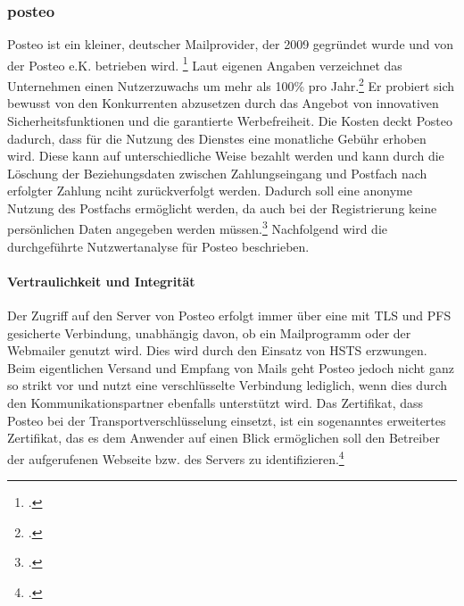 \documentclass  [paper=a4,
				fontsize=12pt,
				listof=totoc,
				bibliography=totoc
				]{scrreprt}
\begin{document}
				\subsubsection{posteo}
				\label{subsubsec:posteo}
					Posteo ist ein kleiner, deutscher Mailprovider, der 2009 gegründet wurde und von der Posteo e.K. betrieben wird. \footcite[Vgl.][]{Posteo2013b}
					Laut eigenen Angaben verzeichnet das Unternehmen einen Nutzerzuwachs um mehr als 100\% pro Jahr.\footcite[Vgl.][]{Posteo2013b}
					Er probiert sich bewusst von den Konkurrenten abzusetzen durch das Angebot von innovativen Sicherheitsfunktionen und die garantierte Werbefreiheit.
					Die Kosten deckt Posteo dadurch, dass für die Nutzung des Dienstes eine monatliche Gebühr erhoben wird.
					Diese kann auf unterschiedliche Weise bezahlt werden und kann durch die Löschung der Beziehungsdaten zwischen Zahlungseingang und Postfach nach erfolgter Zahlung nciht zurückverfolgt werden.
					Dadurch soll eine anonyme Nutzung des Postfachs ermöglicht werden, da auch bei der Registrierung keine persönlichen Daten angegeben werden müssen.\footcite[Vgl.][]{Posteo2013a}
					Nachfolgend wird die durchgeführte Nutzwertanalyse für Posteo beschrieben.
					\medskip\\
					
					\paragraph{Vertraulichkeit und Integrität}
						Der Zugriff auf den Server von Posteo erfolgt immer über eine mit \ac{TLS} und \ac{PFS} gesicherte Verbindung, unabhängig davon, ob ein Mailprogramm oder der Webmailer genutzt wird.
						Dies wird durch den Einsatz von \ac{HSTS} erzwungen.
						Beim eigentlichen Versand und Empfang von Mails geht Posteo jedoch nicht ganz so strikt vor und nutzt eine verschlüsselte Verbindung lediglich, wenn dies durch den Kommunikationspartner ebenfalls unterstützt wird.
						Das Zertifikat, dass Posteo bei der Transportverschlüsselung einsetzt, ist ein sogenanntes erweitertes Zertifikat, das es dem Anwender auf einen Blick ermöglichen soll den Betreiber der aufgerufenen Webseite bzw. des Servers zu identifizieren.\footcite[Vgl.][]{Posteo2013c}\medskip\\
					
\end{document}
